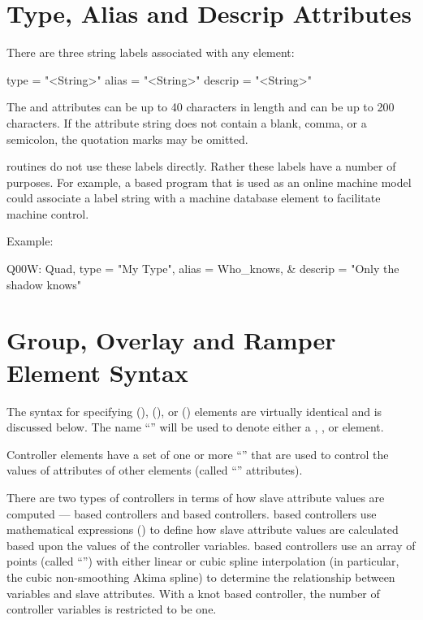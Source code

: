 \section{Type, Alias and Descrip Attributes}
\label{s:alias}

There are three string labels associated with any element:
\begin{example}
  type    = "<String>"
  alias   = "<String>"
  descrip = "<String>"
\end{example}
The  and  attributes can be up to 40 characters in length and  can be
up to 200 characters. If the attribute string does not contain a blank, comma, or a semicolon, the
quotation marks may be omitted.

\bmad routines do not use these labels directly. Rather these labels have a number of purposes. For
example, a \bmad based program that is used as an online machine model could associate a label
string with a machine database element to facilitate machine control.

Example:
\begin{example}
  Q00W: Quad, type = "My Type", alias = Who_knows, &
                                  descrip = "Only the shadow knows"
\end{example}

\section{Group, Overlay and Ramper Element Syntax}
\label{s:go.syntax}

The syntax for specifying  (),  (), or
 () elements
are virtually identical and is discussed below. The name ``'' will be used to denote
either a , , or  element.

Controller elements have a set of one or more ``'' that are used to control the values
of attributes of other elements (called ``'' attributes).

There are two types of controllers in terms of how slave attribute values are computed ---
 based controllers and  based controllers.  based controllers
use mathematical expressions () to define how slave attribute values are calculated
based upon the values of the controller variables.  based controllers use an array of
points (called ``'') with either linear or cubic spline interpolation (in particular, the
cubic non-smoothing Akima spline\cite{b:akima}) to determine the relationship between variables and
slave attributes. With a knot based controller, the number of controller variables is restricted
to be one.

